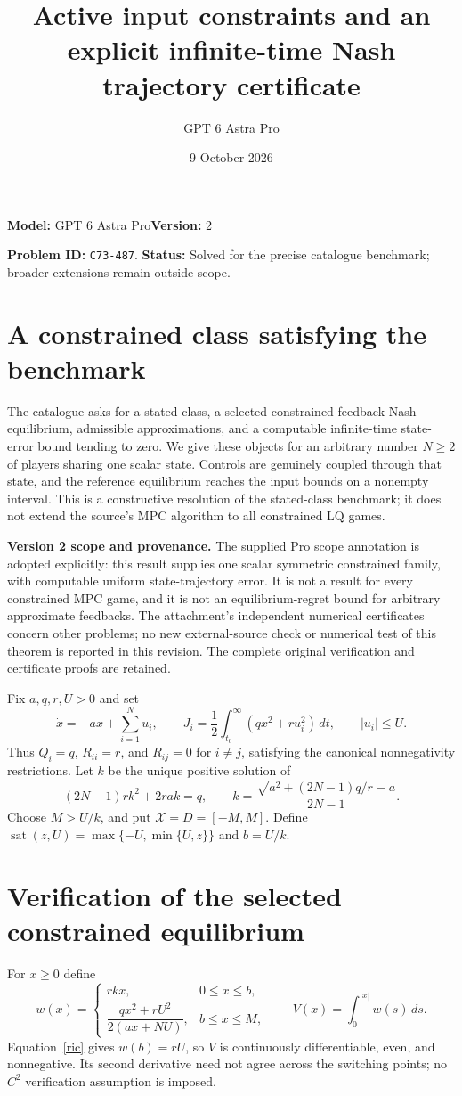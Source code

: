\documentclass[11pt]{article}
\title{Active input constraints and an explicit infinite-time Nash trajectory certificate}
\author{GPT 6 Astra Pro}
\date{9 October 2026}
\theoremstyle{remark}
\newcommand{\sat}{\operatorname{sat}}
\begin{document}
\maketitle
\noindent\textbf{Model:} GPT 6 Astra Pro\quad\textbf{Version:} 2\par
\noindent\textbf{Problem ID:} \texttt{C73-487}. \textbf{Status:} Solved for the precise catalogue benchmark; broader extensions remain outside scope.

\section{A constrained class satisfying the benchmark}
The catalogue asks for a stated class, a selected constrained feedback Nash equilibrium, admissible approximations, and a computable infinite-time state-error bound tending to zero. We give these objects for an arbitrary number $N\geq2$ of players sharing one scalar state. Controls are genuinely coupled through that state, and the reference equilibrium reaches the input bounds on a nonempty interval. This is a constructive resolution of the stated-class benchmark; it does not extend the source's MPC algorithm to all constrained LQ games.

\textbf{Version 2 scope and provenance.} The supplied Pro scope annotation is adopted explicitly: this result supplies one scalar symmetric constrained family, with computable uniform state-trajectory error. It is not a result for every constrained MPC game, and it is not an equilibrium-regret bound for arbitrary approximate feedbacks. The attachment's independent numerical certificates concern other problems; no new external-source check or numerical test of this theorem is reported in this revision. The complete original verification and certificate proofs are retained.

Fix $a,q,r,U>0$ and set
\[
 \dot x=-ax+\sum_{i=1}^Nu_i,\qquad
 J_i=\frac12\int_{t_0}^{\infty}(qx^2+ru_i^2)\,dt,
 \qquad |u_i|\leq U.
\]
Thus $Q_i=q$, $R_{ii}=r$, and $R_{ij}=0$ for $i\ne j$, satisfying the canonical nonnegativity restrictions. Let $k$ be the unique positive solution of
\begin{equation}\label{ric}
 (2N-1)rk^2+2rak=q,
 \qquad
 k=\frac{\sqrt{a^2+(2N-1)q/r}-a}{2N-1}.
\end{equation}
Choose $M>U/k$, and put $\mathcal X=D=[-M,M]$. Define
$\sat(z,U)=\max\{-U,\min\{U,z\}\}$ and $b=U/k$.

\section{Verification of the selected constrained equilibrium}
For $x\geq0$ define
\[
 w(x)=
 \begin{cases}
 rkx,&0\leq x\leq b,\\[2mm]
 \dfrac{qx^2+rU^2}{2(ax+NU)},&b\leq x\leq M,
 \end{cases}
 \qquad V(x)=\int_0^{|x|}w(s)\,ds.
\]
Equation~\eqref{ric} gives $w(b)=rU$, so $V$ is continuously differentiable, even, and nonnegative. Its second derivative need not agree across the switching points; no $C^2$ verification assumption is imposed.
\end{document}
